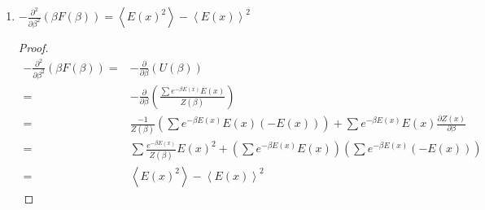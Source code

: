 \documentclass[letterpaper,english,12pt]{article}
\begin{document}
\begin{lem}
\begin{enumerate}
\begin{proof}
\begin{align*}
S(\beta)=& \ln Z(\beta)+\sum \mu_{\beta} \left(-\ln \mu_\beta(x)-\ln Z(\beta) \right)  \\
=&-\sum \mu_\beta \ln \mu_\beta(x)  \hspace{15mm} (\sum \mu_{\beta}(x)=1)\\
=&H(\mu_\beta)/\ln 2
\end{align*}
\end{proof}
\textbf{Thus, the canonical entropy is the Shannon entropy of the Boltzmann distribution (up to a multiplicative constant).} 
\item $-\frac{\partial ^2}{\partial \beta^2} \left( \beta F(\beta) \right)=\left\langle E(x)^2 \right\rangle-\left\langle E(x) \right\rangle^2$
\begin{proof}
\begin{align*}
-\frac{\partial ^2}{\partial \beta^2} \left( \beta F(\beta) \right)=&-\frac{\partial}{\partial \beta} \left( U(\beta)\right) \\
=&-\frac{\partial}{\partial \beta} \left( \frac{\sum e^{-\beta E(x)} E(x)} {Z(\beta)}\right) \\
=&\frac{-1}{Z(\beta)} \left(\sum e^{-\beta E(x)} E(x) (-E(x)) \right)+\sum e^{-\beta E(x)} E(x) \frac{\partial Z(x)}{\partial \beta} \\
=& \sum \frac{e^{-\beta E(x)}}{Z(\beta)} E(x)^2+\left(\sum e^{-\beta E(x)} E(x)\right) \left( \sum e^{-\beta E(x)} (-E(x))\right) \\
=&\left\langle E(x)^2 \right\rangle-\left\langle E(x) \right\rangle^2
\end{align*}
\end{proof}
\end{enumerate}
\end{lem}
\end{document}
